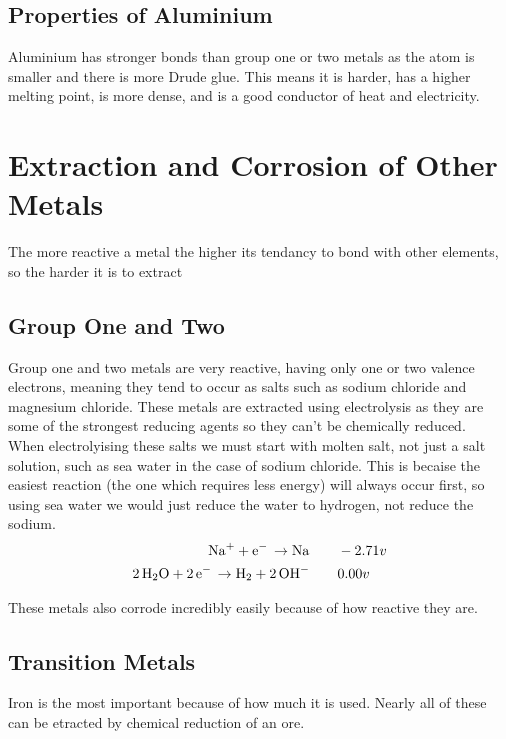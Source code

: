 \documentclass[a4paper, 12pt]{article}
\begin{document}
		\subsection{Properties of Aluminium}
			Aluminium has stronger bonds than group one or two metals as the atom is smaller and there is more Drude glue. This means it is harder, has a higher melting point, is more dense, and is a good conductor of heat and electricity.
			
	\newpage
	
	\section{Extraction and Corrosion of Other Metals}
		The more reactive a metal the higher its tendancy to bond with other elements, so the harder it is to extract
		
		\subsection{Group One and Two}
			Group one and two metals are very reactive, having only one or two valence electrons, meaning they tend to occur as salts such as sodium chloride and magnesium chloride. These metals are extracted using electrolysis as they are some of the strongest reducing agents so they can't be chemically reduced. \\
			When electrolyising these salts we must start with molten salt, not just a salt solution, such as sea water in the case of sodium chloride. This is becaise the easiest reaction (the one which requires less energy) will always occur first, so using sea water we would just reduce the water to hydrogen, not reduce the sodium.
			\begin{align*}
				\ce{Na+ + e- \rightarrow Na} \qquad &-2.71v \\
				\ce{2H2O + 2e- \rightarrow H2 + 2OH-} \qquad &0.00v
			\end{align*}
			
			These metals also corrode incredibly easily because of how reactive they are. 

		\subsection{Transition Metals}
			Iron is the most important because of how much it is used. Nearly all of these can be etracted by chemical reduction of an ore.
\end{document}
